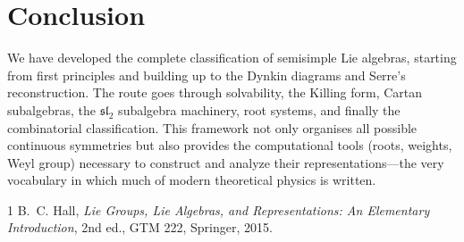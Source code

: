 \documentclass{article}
\theoremstyle{definition}
\theoremstyle{remark}
\begin{document}
\section*{Conclusion}
We have developed the complete classification of semisimple Lie algebras, starting
from first principles and building up to the Dynkin diagrams and Serre’s
reconstruction. The route goes through solvability, the Killing form, Cartan
subalgebras, the $\mathfrak{sl}_2$ subalgebra machinery, root systems, and finally
the combinatorial classification. This framework not only organises all possible
continuous symmetries but also provides the computational tools (roots, weights,
Weyl group) necessary to construct and analyze their representations—the very
vocabulary in which much of modern theoretical physics is written.

\begin{thebibliography}{1}
B.~C. Hall, \emph{Lie Groups, Lie Algebras, and Representations: An Elementary Introduction},
2nd ed., GTM 222, Springer, 2015.
\end{thebibliography}
\end{document}
